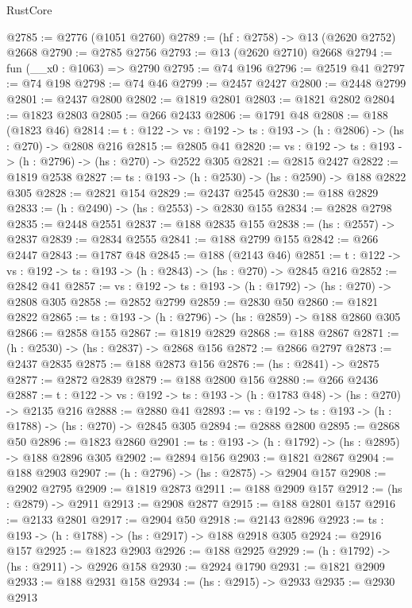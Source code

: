 \begin{lexlean}{RustCore}
\begin{coremodule}
@2785 := @2776 (@1051 @2760)
@2789 := (hf : @2758) -> @13 (@2620 @2752) @2668
@2790 := @2785 @2756
@2793 := @13 (@2620 @2710) @2668
@2794 := fun (__x0 : @1063) => @2790
@2795 := @74 @196
@2796 := @2519 @41
@2797 := @74 @198
@2798 := @74 @46
@2799 := @2457 @2427
@2800 := @2448 @2799
@2801 := @2437 @2800
@2802 := @1819 @2801
@2803 := @1821 @2802
@2804 := @1823 @2803
@2805 := @266 @2433
@2806 := @1791 @48
@2808 := @188 (@1823 @46)
@2814 := {t : @122} -> {vs : @192} -> {ts : @193} -> (h : @2806) -> (hs : @270) -> @2808 @216
@2815 := @2805 @41
@2820 := {vs : @192} -> {ts : @193} -> (h : @2796) -> (hs : @270) -> @2522 @305
@2821 := @2815 @2427
@2822 := @1819 @2538
@2827 := {ts : @193} -> (h : @2530) -> (hs : @2590) -> @188 @2822 @305
@2828 := @2821 @154
@2829 := @2437 @2545
@2830 := @188 @2829
@2833 := (h : @2490) -> (hs : @2553) -> @2830 @155
@2834 := @2828 @2798
@2835 := @2448 @2551
@2837 := @188 @2835 @155
@2838 := (hs : @2557) -> @2837
@2839 := @2834 @2555
@2841 := @188 @2799 @155
@2842 := @266 @2447
@2843 := @1787 @48
@2845 := @188 (@2143 @46)
@2851 := {t : @122} -> {vs : @192} -> {ts : @193} -> (h : @2843) -> (hs : @270) -> @2845 @216
@2852 := @2842 @41
@2857 := {vs : @192} -> {ts : @193} -> (h : @1792) -> (hs : @270) -> @2808 @305
@2858 := @2852 @2799
@2859 := @2830 @50
@2860 := @1821 @2822
@2865 := {ts : @193} -> (h : @2796) -> (hs : @2859) -> @188 @2860 @305
@2866 := @2858 @155
@2867 := @1819 @2829
@2868 := @188 @2867
@2871 := (h : @2530) -> (hs : @2837) -> @2868 @156
@2872 := @2866 @2797
@2873 := @2437 @2835
@2875 := @188 @2873 @156
@2876 := (hs : @2841) -> @2875
@2877 := @2872 @2839
@2879 := @188 @2800 @156
@2880 := @266 @2436
@2887 := {t : @122} -> {vs : @192} -> {ts : @193} -> (h : @1783 @48) -> (hs : @270) -> @2135 @216
@2888 := @2880 @41
@2893 := {vs : @192} -> {ts : @193} -> (h : @1788) -> (hs : @270) -> @2845 @305
@2894 := @2888 @2800
@2895 := @2868 @50
@2896 := @1823 @2860
@2901 := {ts : @193} -> (h : @1792) -> (hs : @2895) -> @188 @2896 @305
@2902 := @2894 @156
@2903 := @1821 @2867
@2904 := @188 @2903
@2907 := (h : @2796) -> (hs : @2875) -> @2904 @157
@2908 := @2902 @2795
@2909 := @1819 @2873
@2911 := @188 @2909 @157
@2912 := (hs : @2879) -> @2911
@2913 := @2908 @2877
@2915 := @188 @2801 @157
@2916 := @2133 @2801
@2917 := @2904 @50
@2918 := @2143 @2896
@2923 := {ts : @193} -> (h : @1788) -> (hs : @2917) -> @188 @2918 @305
@2924 := @2916 @157
@2925 := @1823 @2903
@2926 := @188 @2925
@2929 := (h : @1792) -> (hs : @2911) -> @2926 @158
@2930 := @2924 @1790
@2931 := @1821 @2909
@2933 := @188 @2931 @158
@2934 := (hs : @2915) -> @2933
@2935 := @2930 @2913

\end{coremodule}
\end{lexlean}

